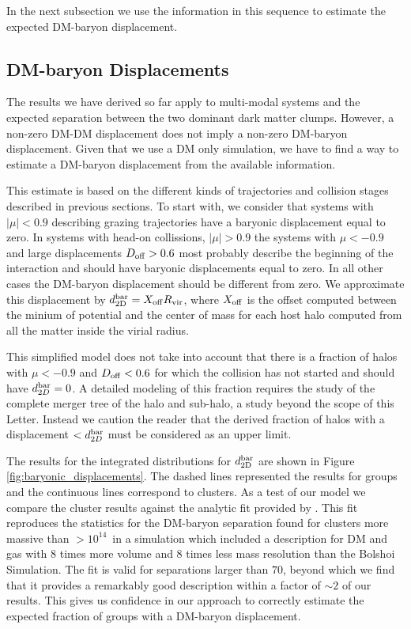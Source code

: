 \documentclass{emulateapj}
\newcommand{\hkpc}{{\ifmmode{h^{-1}{\rm kpc}}\else{$h^{-1}$kpc }\fi}}
\newcommand{\hMsun}{{\ifmmode{h^{-1}{\rm {M_{\odot}}}}\else{$h^{-1}{\rm{M_{\odot}}}$}\fi}}
\begin{document}
In the next subsection we use the information in this sequence to
estimate the expected DM-baryon displacement. 



\subsection{DM-baryon Displacements}
\label{sec:baryonic_displacements}

The results we have derived so far apply to multi-modal systems and
the expected separation between the two dominant dark matter
clumps. However, a non-zero DM-DM displacement does not imply 
a non-zero DM-baryon displacement. Given that we use a DM only
simulation, we have to find a way to estimate a DM-baryon displacement
from the available information.  

This estimate is based on the different kinds of trajectories and
collision stages described in previous sections. To start with, we
consider that systems with $|\mu|<0.9$ describing grazing
trajectories have a baryonic displacement equal to zero.  In systems
with head-on collissions, $|\mu|>0.9$ the systems with $\mu<-0.9$ and
large displacements $D_{\rm   off}>0.6$ most probably describe the
beginning of the interaction and should have baryonic displacements
equal to zero. In all other cases the DM-baryon displacement
should be different from zero. We approximate this displacement by
$d_{\rm   2D}^{\rm bar} = X_{\rm off} R_{\rm   vir}$, where $X_{\rm   off}$ is
the offset computed between the minium of potential and the center of
mass for each host halo computed from all the matter inside the virial
radius.   


This simplified model does not take into account that there is a
fraction of halos with $\mu<-0.9$ and $D_{\rm off}<0.6$ for which the
collision has not started and should have $d_{2D}^{\rm bar}=0$. A detailed
modeling of this fraction requires the study of the complete merger
tree of the halo and sub-halo, a study beyond the scope of this
Letter. Instead we caution the reader that the derived fraction of
halos with a displacement $<d_{2D}^{\rm bar}$ must be considered as an
upper limit. 

The results for the integrated distributions for $d_{\rm 2D}^{\rm bar}$
are shown in Figure \ref{fig:baryonic_displacements}. The dashed lines
represented the results for groups and the continuous lines correspond
to clusters. As a test of our model we compare the cluster results
against the analytic fit provided by \cite{ForeroRomero2010}. This fit
reproduces the statistics for the DM-baryon separation found for
clusters more massive than $>10^{14}$\hMsun\ in a simulation
which included a description for DM and gas with $8$ times more volume
and $8$ times less mass resolution than the Bolshoi Simulation. The
fit is valid for separations larger than $70$\hkpc, beyond which we
find that it provides a remarkably good description within a factor of
$\sim 2$ of our results. This gives us confidence in our approach to
correctly estimate the expected fraction of groups with a DM-baryon
displacement. 
\end{document}
